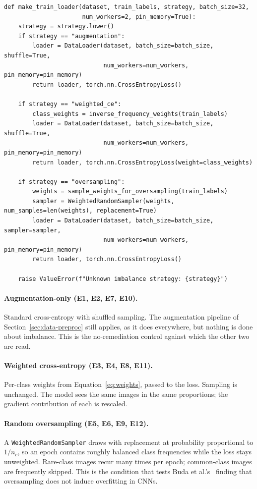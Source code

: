 \begin{lstlisting}[caption={The three strategies, \texttt{src/ham10000/imbalance.py}.
Each returns a dataloader and the loss function that goes with it.},
                   label={lst:imbalance}]
def make_train_loader(dataset, train_labels, strategy, batch_size=32,
                      num_workers=2, pin_memory=True):
    strategy = strategy.lower()
    if strategy == "augmentation":
        loader = DataLoader(dataset, batch_size=batch_size, shuffle=True,
                            num_workers=num_workers, pin_memory=pin_memory)
        return loader, torch.nn.CrossEntropyLoss()

    if strategy == "weighted_ce":
        class_weights = inverse_frequency_weights(train_labels)
        loader = DataLoader(dataset, batch_size=batch_size, shuffle=True,
                            num_workers=num_workers, pin_memory=pin_memory)
        return loader, torch.nn.CrossEntropyLoss(weight=class_weights)

    if strategy == "oversampling":
        weights = sample_weights_for_oversampling(train_labels)
        sampler = WeightedRandomSampler(weights, num_samples=len(weights), replacement=True)
        loader = DataLoader(dataset, batch_size=batch_size, sampler=sampler,
                            num_workers=num_workers, pin_memory=pin_memory)
        return loader, torch.nn.CrossEntropyLoss()

    raise ValueError(f"Unknown imbalance strategy: {strategy}")
\end{lstlisting}

\paragraph{Augmentation-only (E1, E2, E7, E10).} Standard cross-entropy with shuffled
sampling. The augmentation pipeline of Section~\ref{sec:data-preproc} still applies, as
it does everywhere, but nothing is done about imbalance. This is the no-remediation
control against which the other two are read.

\paragraph{Weighted cross-entropy (E3, E4, E8, E11).} Per-class weights from
Equation~\ref{eq:weights}, passed to the loss. Sampling is unchanged. The model sees the
same images in the same proportions; the gradient contribution of each is rescaled.

\paragraph{Random oversampling (E5, E6, E9, E12).} A
\texttt{WeightedRandomSampler} draws with replacement at probability proportional to
$1/n_c$, so an epoch contains roughly balanced class frequencies while the loss stays
unweighted. Rare-class images recur many times per epoch; common-class images are
frequently skipped. This is the condition that tests Buda et
al.'s~\cite{buda2018classimbalance} finding that oversampling does not induce
overfitting in CNNs.

